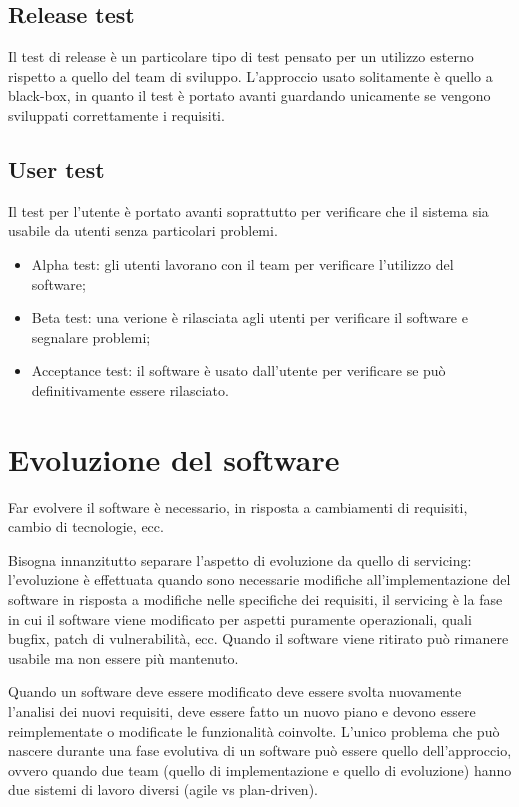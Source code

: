 \documentclass[a4paper, 10pt]{article}
\begin{document}
	\subsection{Release test}
	Il test di release è un particolare tipo di test pensato per un utilizzo esterno rispetto a quello del team di sviluppo. L'approccio usato solitamente è quello a black-box, in quanto il test è portato avanti guardando unicamente se vengono sviluppati correttamente i requisiti.
	
	\subsection{User test}
	Il test per l'utente è portato avanti soprattutto per verificare che il sistema sia usabile da utenti senza particolari problemi.
	\begin{itemize}
		\item Alpha test: gli utenti lavorano con il team per verificare l'utilizzo del software;
		\item Beta test: una verione è rilasciata agli utenti per verificare il software e segnalare problemi;
		\item Acceptance test: il software è usato dall'utente per verificare se può definitivamente essere rilasciato.
	\end{itemize}

\section{Evoluzione del software}
Far evolvere il software è necessario, in risposta a cambiamenti di requisiti, cambio di tecnologie, ecc.

Bisogna innanzitutto separare l'aspetto di evoluzione da quello di servicing: l'evoluzione è effettuata quando sono necessarie modifiche all'implementazione del software in risposta a modifiche nelle specifiche dei requisiti, il servicing è la fase in cui il software viene modificato per aspetti puramente operazionali, quali bugfix, patch di vulnerabilità, ecc. Quando il software viene ritirato può rimanere usabile ma non essere più mantenuto.

Quando un software deve essere modificato deve essere svolta nuovamente l'analisi dei nuovi requisiti, deve essere fatto un nuovo piano e devono essere reimplementate o modificate le funzionalità coinvolte. L'unico problema che può nascere durante una fase evolutiva di un software può essere quello dell'approccio, ovvero quando due team (quello di implementazione e quello di evoluzione) hanno due sistemi di lavoro diversi (agile vs plan-driven).
\end{document}
